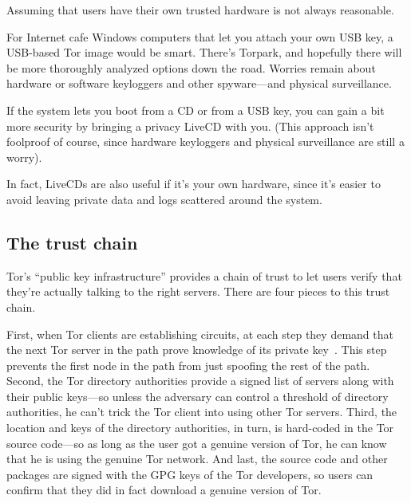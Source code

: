 \documentclass{llncs}
\begin{document}
Assuming that users have their own trusted hardware is not
always reasonable.

For Internet cafe Windows computers that let you attach your own USB key,
a USB-based Tor image would be smart. There's Torpark, and hopefully
there will be more thoroughly analyzed options down the road. Worries
remain about hardware or
software keyloggers and other spyware---and physical surveillance.

If the system lets you boot from a CD or from a USB key, you can gain
a bit more security by bringing a privacy LiveCD with you. (This
approach isn't foolproof of course, since hardware
keyloggers and physical surveillance are still a worry).

In fact, LiveCDs are also useful if it's your own hardware, since it's
easier to avoid leaving private data and logs scattered around the
system.

%

\subsection{The trust chain}
\label{subsec:trust-chain}

Tor's ``public key infrastructure'' provides a chain of trust to
let users verify that they're actually talking to the right servers.
There are four pieces to this trust chain.

First, when Tor clients are establishing circuits, at each step
they demand that the next Tor server in the path prove knowledge of
its private key~\cite{tor-design}. This step prevents the first node
in the path from just spoofing the rest of the path. Second, the
Tor directory authorities provide a signed list of servers along with
their public keys---so unless the adversary can control a threshold
of directory authorities, he can't trick the Tor client into using other
Tor servers. Third, the location and keys of the directory authorities,
in turn, is hard-coded in the Tor source code---so as long as the user
got a genuine version of Tor, he can know that he is using the genuine
Tor network. And last, the source code and other packages are signed
with the GPG keys of the Tor developers, so users can confirm that they
did in fact download a genuine version of Tor.
\end{document}
